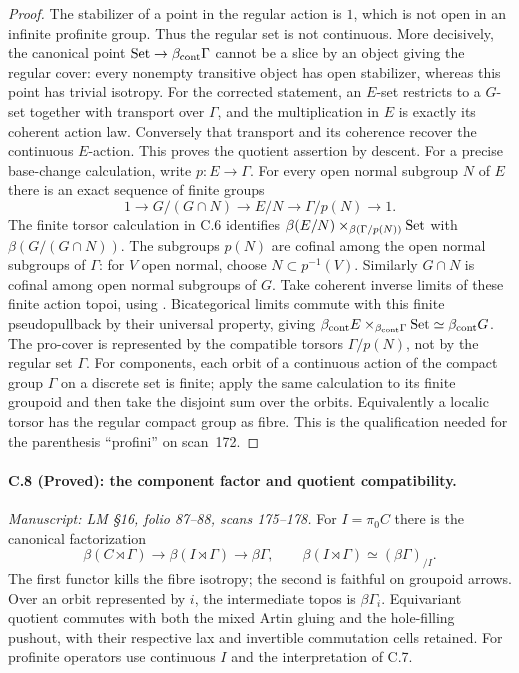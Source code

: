 \begin{proof}
The stabilizer of a point in the regular
action is $1$, which is not open in an
infinite profinite group. Thus the regular
set is not continuous. More decisively,
the canonical point $\mathrm{Set}\to
\beta_{\mathrm{cont}}\Gamma$ cannot be a
slice by an object giving the regular
cover: every nonempty transitive object
has open stabilizer, whereas this point
has trivial isotropy. For the corrected
statement, an $E$-set restricts to a $G$-set together with
transport over $\Gamma$, and the multiplication in $E$
is exactly its coherent action law. Conversely that
transport and its coherence recover the continuous
$E$-action. This proves the quotient assertion by descent.
For a precise base-change calculation, write $p:E\to\Gamma$.
For every open normal subgroup $N$ of $E$ there is an exact
sequence of finite groups
\[
 1\to G/(G\cap N)\to E/N\to\Gamma/p(N)\to1.
\]
The finite torsor calculation in C.6 identifies
$\beta(E/N)\mathbin{\times}_{\beta(\Gamma/p(N))}\mathrm{Set}$
with $\beta(G/(G\cap N))$. The subgroups $p(N)$ are cofinal
among the open normal subgroups of $\Gamma$: for $V$ open
normal, choose $N\subset p^{-1}(V)$. Similarly $G\cap N$
is cofinal among open normal subgroups of $G$. Take coherent
inverse limits of these finite action topoi, using
\citep[VI, \S8]{SGA4II}. Bicategorical limits commute with
this finite pseudopullback by their universal property,
giving $\beta_{\rm cont}E\times_{\beta_{\rm cont}\Gamma}\mathrm{Set}
\simeq\beta_{\rm cont}G$. The pro-cover is represented by
the compatible torsors $\Gamma/p(N)$, not by the regular
set $\Gamma$. For components, each orbit of a continuous
action of the compact group $\Gamma$ on a discrete set is
finite; apply the same calculation to its finite groupoid
and then take the disjoint sum over the orbits.
Equivalently a localic torsor has the regular compact
group as fibre. This is the qualification
needed for the parenthesis ``profini''
on scan~172.
\end{proof}

\paragraph{C.8 (Proved): the component factor and quotient compatibility.}\label{C8}
\textit{Manuscript: LM \S16, folio 87--88, scans 175--178.}
For $I=\pi_0C$ there is the canonical factorization
\[
 \beta(C\rtimes\Gamma)\longrightarrow
 \beta(I\rtimes\Gamma)\longrightarrow\beta\Gamma,
 \qquad \beta(I\rtimes\Gamma)\simeq(\beta\Gamma)_{/I}.
                                                               \tag{C.8.1}
\]
The first functor kills the fibre isotropy;
the second is faithful on groupoid arrows.
Over an orbit represented by $i$, the
intermediate topos is $\beta\Gamma_i$.
Equivariant quotient commutes with both
the mixed Artin gluing and the hole-filling
pushout, with their respective lax and
invertible commutation cells retained.
For profinite operators use continuous
$I$ and the interpretation of C.7.

